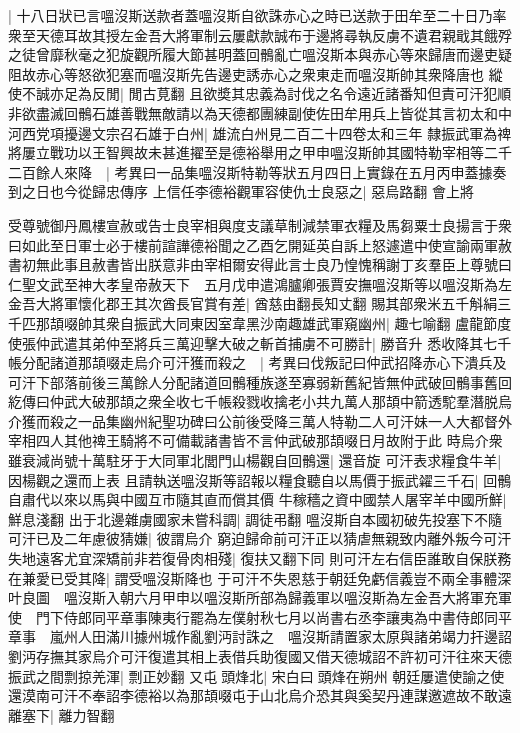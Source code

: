 |{
	十八日狀已言嗢沒斯送款者蓋嗢沒斯自欲誅赤心之時已送款于田牟至二十日乃率衆至天德耳故其授左金吾大將軍制云屢獻款誠布于邊將尋執反虜不遺君親戢其餓殍之徒曾靡秋毫之犯旋觀所履大節甚明蓋回鶻亂亡嗢沒斯本與赤心等來歸唐而邊吏疑阻故赤心等怒欲犯塞而嗢沒斯先告邊吏誘赤心之衆東走而嗢沒斯帥其衆降唐也}
縱使不誠亦足為反閒|{
	閒古莧翻}
且欲奬其忠義為討伐之名令遠近諸番知但責可汗犯順非欲盡滅回鶻石雄善戰無敵請以為天德都團練副使佐田牟用兵上皆從其言初太和中河西党項擾邊文宗召石雄于白州|{
	雄流白州見二百二十四卷太和三年}
隸振武軍為禆將屢立戰功以王智興故未甚進擢至是德裕舉用之甲申嗢沒斯帥其國特勒宰相等二千二百餘人來降　|{
	考異曰一品集嗢沒斯特勒等狀五月四日上實錄在五月丙申蓋據奏到之日也今從歸忠傳序}
上信任李德裕觀軍容使仇士良惡之|{
	惡烏路翻}
會上將

受尊號御丹鳳樓宣赦或告士良宰相與度支議草制減禁軍衣糧及馬芻粟士良揚言于衆曰如此至日軍士必于樓前諠譁德裕聞之乙酉乞開延英自訴上怒遽遣中使宣諭兩軍赦書初無此事且赦書皆出朕意非由宰相爾安得此言士良乃惶愧稱謝丁亥羣臣上尊號曰仁聖文武至神大孝皇帝赦天下　五月戊申遣鴻臚卿張賈安撫嗢沒斯等以嗢沒斯為左金吾大將軍懷化郡王其次酋長官賞有差|{
	酋慈由翻長知丈翻}
賜其部衆米五千斛絹三千匹那頡啜帥其衆自振武大同東因室韋黑沙南趣雄武軍窺幽州|{
	趣七喻翻}
盧龍節度使張仲武遣其弟仲至將兵三萬迎擊大破之斬首捕虜不可勝計|{
	勝音升}
悉收降其七千帳分配諸道那頡啜走烏介可汗獲而殺之　|{
	考異曰伐叛記曰仲武招降赤心下潰兵及可汗下部落前後三萬餘人分配諸道回鶻種族遂至寡弱新舊紀皆無仲武破回鶻事舊回紇傳曰仲武大破那頡之衆全收七千帳殺戮收擒老小共九萬人那頡中箭透駝羣潛脱烏介獲而殺之一品集幽州紀聖功碑曰公前後受降三萬人特勒二人可汗妹一人大都督外宰相四人其他禆王騎將不可備載諸書皆不言仲武破那頡啜日月故附于此}
時烏介衆雖衰減尚號十萬駐牙于大同軍北閭門山楊觀自回鶻還|{
	還音旋}
可汗表求糧食牛羊|{
	因楊觀之還而上表}
且請執送嗢沒斯等詔報以糧食聽自以馬價于振武糴三千石|{
	回鶻自肅代以來以馬與中國互市隨其直而償其價}
牛稼穡之資中國禁人屠宰羊中國所鮮|{
	鮮息淺翻}
出于北邊雜虜國家未嘗科調|{
	調徒弔翻}
嗢沒斯自本國初破先投塞下不隨可汗已及二年慮彼猜嫌|{
	彼謂烏介}
窮迫歸命前可汗正以猜虐無親致内離外叛今可汗失地遠客尤宜深矯前非若復骨肉相殘|{
	復扶又翻下同}
則可汗左右信臣誰敢自保朕務在兼愛已受其降|{
	謂受嗢沒斯降也}
于可汗不失恩慈于朝廷免虧信義豈不兩全事體深叶良圖　嗢沒斯入朝六月甲申以嗢沒斯所部為歸義軍以嗢沒斯為左金吾大將軍充軍使　門下侍郎同平章事陳夷行罷為左僕射秋七月以尚書右丞李讓夷為中書侍郎同平章事　嵐州人田滿川據州城作亂劉沔討誅之　嗢沒斯請置家太原與諸弟竭力扞邊詔劉沔存撫其家烏介可汗復遣其相上表借兵助復國又借天德城詔不許初可汗往來天德振武之間剽掠羌渾|{
	剽正妙翻}
又屯頭烽北|{
	宋白曰頭烽在朔州}
朝廷屢遣使諭之使還漠南可汗不奉詔李德裕以為那頡啜屯于山北烏介恐其與奚契丹連謀邀遮故不敢遠離塞下|{
	離力智翻}
